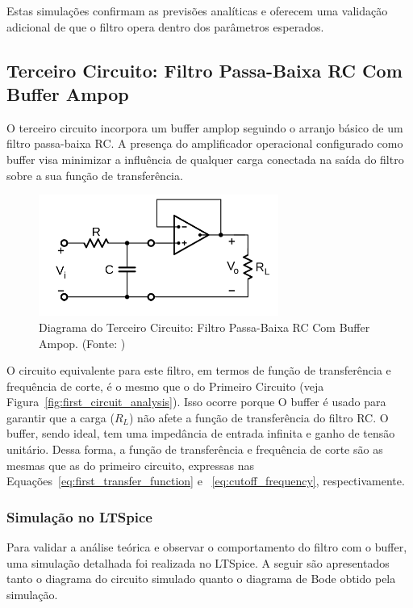 \documentclass[
	12pt,				%
	openright,			%
	twoside,			%
	a4paper,			%
	english,			%
	french,				%
	spanish,			%
	brazil,				%
	]{abntex2}
\begin{document}
Estas simulações confirmam as previsões analíticas e oferecem uma validação adicional de que o filtro opera dentro dos parâmetros esperados.
\pagebreak

\subsection{Terceiro Circuito: Filtro Passa-Baixa RC Com Buffer Ampop}
O terceiro circuito incorpora um buffer amplop seguindo o arranjo básico de um filtro passa-baixa RC. A presença do amplificador operacional configurado como buffer visa minimizar a influência de qualquer carga conectada na saída do filtro sobre a sua função de transferência.

\begin{figure}[H]
\centering
\includegraphics[width=0.7\textwidth]{imgs/third_circuit_diagram.png}
\caption{Diagrama do Terceiro Circuito: Filtro Passa-Baixa RC Com Buffer Ampop. (Fonte: \cite{ufpe2023pratica})}
\label{fig:third_circuit_analysis}
\end{figure}

O circuito equivalente para este filtro, em termos de função de transferência e frequência de corte, é o mesmo que o do Primeiro Circuito (veja Figura~\ref{fig:first_circuit_analysis}). Isso ocorre porque  O buffer é usado para garantir que a carga ($R_L$) não afete a função de transferência do filtro RC. O buffer, sendo ideal, tem uma impedância de entrada infinita e ganho de tensão unitário. Dessa forma, a função de transferência e frequência de corte são as mesmas que as do primeiro circuito, expressas nas Equações~\ref{eq:first_transfer_function} e ~\ref{eq:cutoff_frequency}, respectivamente.

\pagebreak

\subsubsection{Simulação no LTSpice}
Para validar a análise teórica e observar o comportamento do filtro com o buffer, uma simulação detalhada foi realizada no LTSpice. A seguir são apresentados tanto o diagrama do circuito simulado quanto o diagrama de Bode obtido pela simulação.
\end{document}
